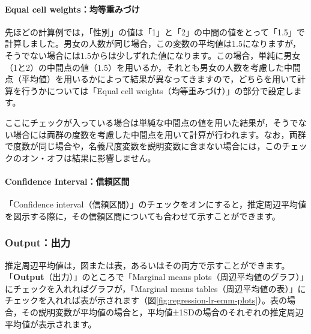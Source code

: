 \documentclass[
  12pt,
  a5jpaper,
  lualatex, ja=standard]{bxjsbook}
\begin{document}
\hypertarget{equal-cell-weightsux5747ux7b49ux91cdux307fux3065ux3051-1}{%
\paragraph*{Equal cell weights：均等重みづけ}\label{equal-cell-weightsux5747ux7b49ux91cdux307fux3065ux3051-1}}

先ほどの計算例では，「性別」の値は「1」と「2」の中間の値をとって「1.5」で計算しました。男女の人数が同じ場合，この変数の平均値は1.5になりますが，そうでない場合には1.5からは少しずれた値になります。この場合，単純に男女（1と2）の中間点の値（1.5）を用いるか，それとも男女の人数を考慮した中間点（平均値）を用いるかによって結果が異なってきますので，どちらを用いて計算を行うかについては「Equal cell weights（均等重みづけ）」の部分で設定します。

ここにチェックが入っている場合は単純な中間点の値を用いた結果が，そうでない場合には両群の度数を考慮した中間点を用いて計算が行われます。なお，両群で度数が同じ場合や，名義尺度変数を説明変数に含まない場合には，このチェックのオン・オフは結果に影響しません。

\hypertarget{confidence-intervalux4fe1ux983cux533aux9593-1}{%
\paragraph*{Confidence Interval：信頼区間}\label{confidence-intervalux4fe1ux983cux533aux9593-1}}

「Confidence interval（信頼区間）」のチェックをオンにすると，推定周辺平均値を図示する際に，その信頼区間についても合わせて示すことができます。

\hypertarget{outputux51faux529b-1}{%
\subsubsection*{Output：出力}\label{outputux51faux529b-1}}

推定周辺平均値は，図または表，あるいはその両方で示すことができます。「\textbf{Output}（出力）」のところで「Marginal means plots（周辺平均値のグラフ）」にチェックを入れればグラフが，「Marginal means tables（周辺平均値の表）」にチェックを入れれば表が示されます（図\ref{fig:regression-lr-emm-plots}）。表の場合，その説明変数が平均値の場合と，平均値±1SDの場合のそれぞれの推定周辺平均値が表示されます。
\end{document}
